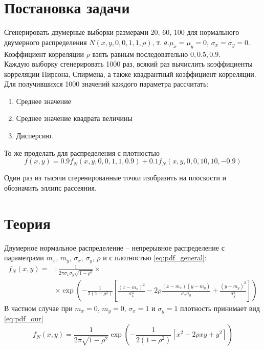 \documentclass[main.tex]{subfiles}
\begin{document}
\section{Постановка задачи}
Сгенерировать двумерные выборки размерами 20, 60, 100 для нормального двумерного распределения $N(x, y, 0, 0, 1, 1, \rho)$, т. е.$\mu_x = \mu_y = 0$, $\sigma_x =\sigma_y = 0$.
Коэффициент корреляции $\rho$ взять равным последовательно $0, 0.5, 0.9$.\\
Каждую выборку сгенерировать 1000 раз, всякий раз вычислить коэффициенты корреляции Пирсона, Спирмена, а также квадрантный коэффициент корреляции. Для получившихся 1000 значений каждого параметра рассчитать:
\begin{enumerate}
	\item Среднее значение
	\item Среднее значение квадрата величины
	\item Дисперсию.
\end{enumerate}
То же проделать для распределения с плотностью
\begin{equation}\label{eq:mix}
f(x,y)= 0.9 f_N(x,y,0,0,1,1,0.9) + 0.1 f_N(x,y,0,0,10,10,-0.9)
\end{equation}

Один раз из тысячи сгеренированные точки изобразить на плоскости и обозначить эллипс рассеяния.

\newpage
\section{Теория}
Двумерное нормальное распределение \cite{sevastianov} -- непрерывное распределение с параметрами $m_x$, $m_y$, $\sigma_x$, $\sigma_y$, $\rho$ и с плотностью \eqref{eq:pdf_general}:
\begin{equation}\label{eq:pdf_general}
\begin{split}
f_N(x,y) = &: \frac{1}{2\pi\sigma_x \sigma_y \sqrt{1-\rho^2}} \times \\
& \times \exp \left( - \frac{1}{2(1-\rho^2)} \left[\frac{(x-m_x)^2}{\sigma_x^2} - 2 \rho \frac{(x-m_x)(y-m_y)}{\sigma_x \sigma_y} + \frac{(y-m_y)^2}{\sigma_y^2}\right]\right)
\end{split}
\end{equation}
В частном случае при $m_x=0$, $m_y=0$, $\sigma_x=1$ и $\sigma_y=1$ плотность принимает вид \eqref{eq:pdf_our}
\begin{equation}\label{eq:pdf_our}
	f_N(x,y) = \frac{1}{2\pi \sqrt{1-\rho^2}} \exp \left( - \frac{1}{2(1-\rho^2)} \left[x^2 - 2 \rho xy + y^2\right]\right)
\end{equation}
\end{document}
